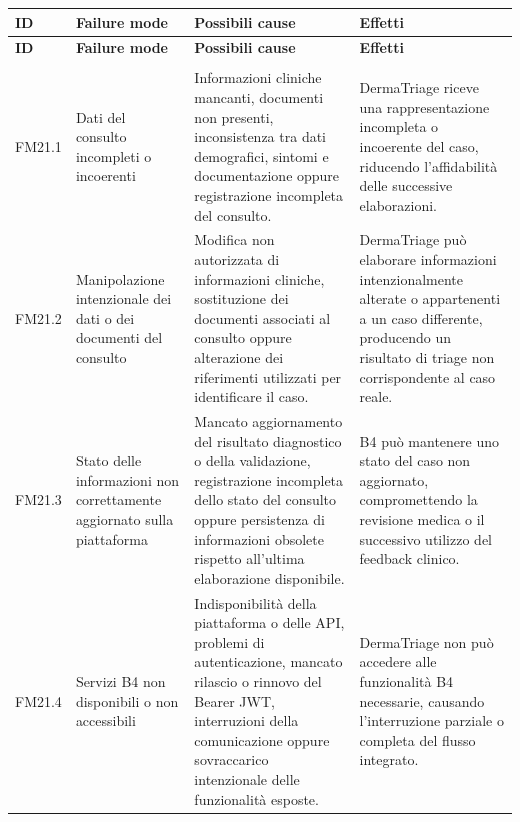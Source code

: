 {
\small
{}
\setlength{\tabcolsep}{4pt}
\renewcommand{\arraystretch}{1.08}

\begin{xltabular}{\textwidth}{
    >{\raggedright\arraybackslash}p{1.1cm}
    >{\raggedright\arraybackslash}p{3cm}
    >{\raggedright\arraybackslash}p{5cm}
    X
}

\toprule
\textbf{ID} &
\textbf{Failure mode} &
\textbf{Possibili cause} &
\textbf{Effetti} \\
\midrule
\endfirsthead

\toprule
\textbf{ID} &
\textbf{Failure mode} &
\textbf{Possibili cause} &
\textbf{Effetti} \\
\midrule
\endhead

 \\
\endfoot

\endlastfoot

FM21.1 &
Dati del consulto incompleti o incoerenti &
Informazioni cliniche mancanti, documenti non presenti,
inconsistenza tra dati demografici, sintomi e documentazione
oppure registrazione incompleta del consulto. &
DermaTriage riceve una rappresentazione incompleta o incoerente
del caso, riducendo l'affidabilità delle successive elaborazioni. \\

\midrule

FM21.2 &
Manipolazione intenzionale dei dati o dei documenti del consulto &
Modifica non autorizzata di informazioni cliniche, sostituzione
dei documenti associati al consulto oppure alterazione dei
riferimenti utilizzati per identificare il caso. &
DermaTriage può elaborare informazioni intenzionalmente alterate
o appartenenti a un caso differente, producendo un risultato di
triage non corrispondente al caso reale. \\

\midrule

FM21.3 &
Stato delle informazioni non correttamente aggiornato sulla piattaforma &
Mancato aggiornamento del risultato diagnostico o della validazione,
registrazione incompleta dello stato del consulto oppure persistenza
di informazioni obsolete rispetto all'ultima elaborazione disponibile. &
B4 può mantenere uno stato del caso non aggiornato, compromettendo
la revisione medica o il successivo utilizzo del feedback clinico. \\

\midrule

FM21.4 &
Servizi B4 non disponibili o non accessibili &
Indisponibilità della piattaforma o delle API, problemi di
autenticazione, mancato rilascio o rinnovo del Bearer JWT,
interruzioni della comunicazione oppure sovraccarico intenzionale
delle funzionalità esposte. &
DermaTriage non può accedere alle funzionalità B4 necessarie,
causando l'interruzione parziale o completa del flusso integrato. \\


\end{xltabular}}
